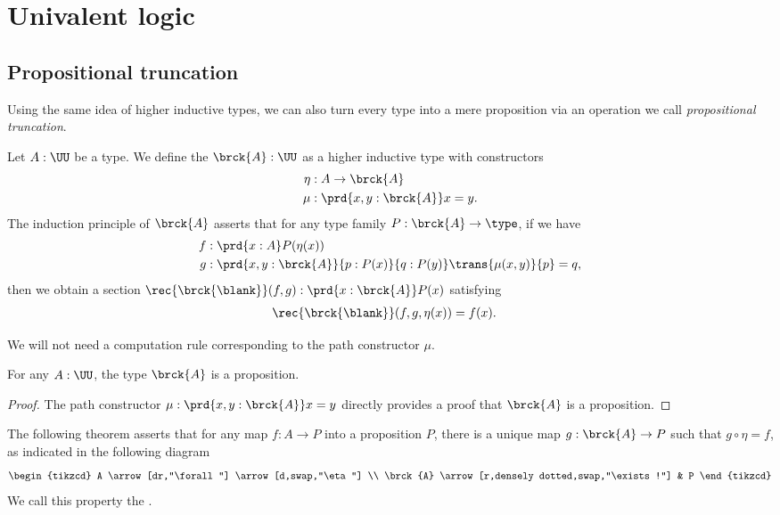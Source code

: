 \chapter{Univalent logic}


\section{Propositional truncation}

Using the same idea of higher inductive types, we can also turn every type into a mere proposition via an operation we call \emph{propositional truncation}. 

\begin{defn}
Let $A:\UU$ be a type. We define the  $\brck{A}:\UU$ as a higher inductive type with constructors
\begin{align*}
\eta & : A\to \brck{A} \\
\mu & : \prd{x,y:\brck{A}} x=y.
\end{align*}
The induction principle of $\brck{A}$ asserts that for any type family $P:\brck{A}\to\type$, if we have
\begin{align*}
f & : \prd{x:A}P(\eta(x)) \\
g & : \prd{x,y:\brck{A}}{p:P(x)}{q:P(y)} \trans{\mu(x,y)}{p}=q,
\end{align*}
then we obtain a section $\rec{\brck{\blank}}(f,g):\prd{x:\brck{A}}P(x)$ satisfying
\begin{align*}
\rec{\brck{\blank}}(f,g,\eta(x)) & = f(x).
\end{align*}
\end{defn}

\begin{rmk}
We will not need a computation rule corresponding to the path constructor $\mu$.
\end{rmk}

\begin{lem}
For any $A:\UU$, the type $\brck{A}$ is a proposition.
\end{lem}

\begin{proof}
The path constructor $\mu:\prd{x,y:\brck{A}}x=y$ directly provides a proof that $\brck{A}$ is a proposition.
\end{proof}

The following theorem asserts that for any map $f:A\to P$ into a proposition $P$, there is a unique map $g:\brck{A}\to P$ such that $g\circ\eta=f$, as indicated in the following diagram
\begin{equation*}
\begin{tikzcd}
A \arrow[dr,"\forall"] \arrow[d,swap,"\eta"] \\
\brck{A} \arrow[r,densely dotted,swap,"\exists!"] & P
\end{tikzcd}
\end{equation*}
We call this property the . 

